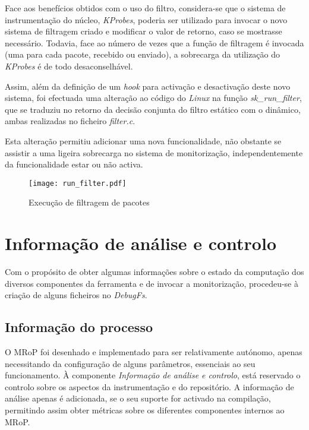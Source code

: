Face aos benefícios obtidos com o uso do filtro, considera-se que o sistema de instrumentação do núcleo, \textit{KProbes}, poderia ser utilizado para invocar o novo sistema de filtragem criado e modificar o valor de retorno, caso se mostrasse necessário.
Todavia, face ao número de vezes que a função de filtragem é invocada (uma para cada pacote, recebido ou enviado), a sobrecarga da utilização do \textit{KProbes} é de todo desaconselhável.

Assim, além da definição de um \textit{hook} para activação e desactivação deste novo sistema, foi efectuada uma alteração ao código do \textit{Linux} na função \textit{sk\_run\_filter}, que se traduziu no retorno da decisão conjunta do filtro estático com o dinâmico, ambas realizadas no ficheiro \textit{filter.c}.

Esta alteração permitiu adicionar uma nova funcionalidade, não obstante se assistir a uma ligeira sobrecarga no sistema de monitorização, independentemente da funcionalidade estar ou não activa.

\begin{figure}[ht]
\centering
\texttt{[image: run\_filter.pdf]}
\caption{Execução de filtragem de pacotes}
\label{fig:run_filter}
\end{figure}

\section{Informação de análise e controlo}

Com o propósito de obter algumas informações sobre o estado da computação dos diversos componentes da ferramenta e de invocar a monitorização, procedeu-se à criação de alguns ficheiros no \textit{DebugFs}.


\subsection{Informação do processo}


O MRoP foi desenhado e implementado para ser relativamente autónomo, apenas necessitando da configuração de alguns parâmetros, essenciais ao seu funcionamento.
À componente \textit{Informação de análise e controlo}, está reservado o controlo sobre os aspectos da instrumentação e do repositório.
A informação de análise apenas é adicionada, se o seu suporte for activado na compilação, permitindo assim obter métricas sobre os diferentes componentes internos ao MRoP.

